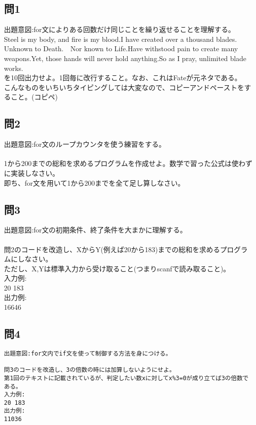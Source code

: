 \documentclass[a4j,titlepage,dvipdfmx]{jsarticle}   %
\begin{document}
\subsection{問1}
出題意図:for文によりある回数だけ同じことを繰り返せることを理解する。\\

Steel is my body, and fire is my blood.I have created over a thousand blades.　Unknown to Death.　Nor known to Life.Have withstood pain to create many weapons.Yet, those hands will never hold anything.So as I pray, unlimited blade works.\\
を10回出力せよ。1回毎に改行すること。なお、これはFateが元ネタである。\\
こんなものをいちいちタイピングしては大変なので、コピーアンドペーストをすること。(コピペ)\\

\subsection{問2}
出題意図:for文のループカウンタを使う練習をする。\\
\\
1から200までの総和を求めるプログラムを作成せよ。数学で習った公式は使わずに実装しなさい。\\
即ち、for文を用いて1から200までを全て足し算しなさい。\\

\subsection{問3}
出題意図:for文の初期条件、終了条件を大まかに理解する。\\
\\
問2のコードを改造し、XからY(例えば20から183)までの総和を求めるプログラムにしなさい。\\
ただし、X,Yは標準入力から受け取ること(つまりscanfで読み取ること)。\\
入力例:\\
20 183\\
出力例:\\
16646\\

\subsection{問4}
\begin{verbatim}
出題意図:for文内でif文を使って制御する方法を身につける。

問3のコードを改造し、3の倍数の時には加算しないようにせよ。
第1回のテキストに記載されているが、判定したい数xに対してx%3=0が成り立てば3の倍数である。
入力例:
20 183
出力例:
11036
\end{verbatim}
\end{document}
